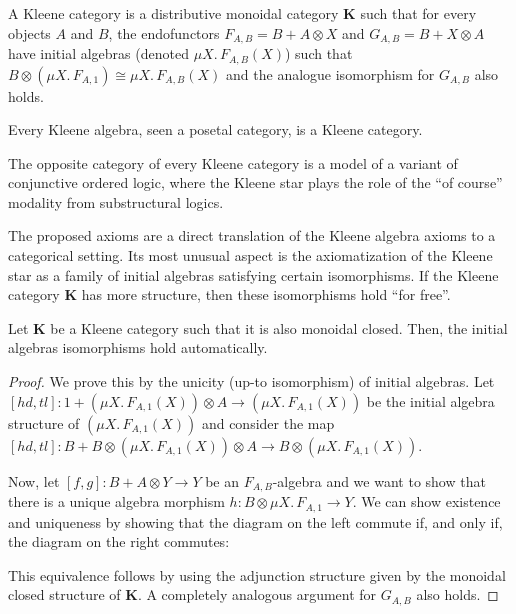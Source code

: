 \documentclass[sigconf,anonymous,review,screen]{acmart}
\newcommand{\cat}[1]{\mathbf{#1}}
\newif\ifdraft
\newcommand{\steven}[1]{\ifdraft{\color{orange}[{\bf Steven}: #1]}\fi}
\begin{document}
\begin{definition}
  A Kleene category is a distributive monoidal category $\cat{K}$
  such that for every objects $A$ and $B$, the endofunctors $F_{A, B}
  = B + A \otimes X$ and $G_{A, B} = B + X \otimes A$ have initial
  algebras (denoted $\mu X.\, F_{A, B}(X)$) such that $B \otimes (\mu
  X.\, F_{A, 1}) \cong \mu X.\, F_{A, B}(X)$ and the analogue isomorphism
  for $G_{A,B}$ also holds.
\end{definition}

\begin{example}
  Every Kleene algebra, seen a posetal category, is a Kleene category.
\end{example}

\begin{example}
  The opposite category of every Kleene category is a model of a variant of
  conjunctive ordered logic, where the Kleene star plays the role of the ``of
  course'' modality from substructural logics.
\end{example}

\steven{What is the ``of course'' modality? Is this ``$!$'' in linear logic?}

The proposed axioms are a direct translation of the Kleene algebra
axioms to a categorical setting. Its most unusual aspect is the
axiomatization of the Kleene star as a family of initial algebras
satisfying certain isomorphisms. If the Kleene category $\cat{K}$ has
more structure, then these isomorphisms hold ``for free''.

\begin{theorem}
  \label{th:kleeneclosed}
  Let $\cat{K}$ be a Kleene category such that it is also monoidal
  closed.  Then, the initial algebras isomorphisms hold automatically.
\end{theorem}
\begin{proof}
  We prove this by the unicity (up-to isomorphism) of initial
  algebras. Let $[hd, tl]: 1 + (\mu X.\, F_{A, 1}(X)) \otimes A \to
  (\mu X.\, F_{A, 1}(X))$ be the initial algebra structure of $(\mu
  X.\, F_{A, 1}(X))$ and consider the map $[hd, tl] : B + B \otimes
  (\mu X.\, F_{A, 1}(X)) \otimes A \to B\otimes (\mu X.\, F_{A,
    1}(X))$.

  Now, let $[f,g] : B + A \otimes Y \to Y$ be an $F_{A,B}$-algebra and
  we want to show that there is a unique algebra morphism $h : B
  \otimes \mu X.\, F_{A,1} \to Y$. We can show existence and uniqueness
  by showing that the diagram on the left commute if, and only if,
  the diagram on the right commutes:

  This equivalence follows by using the adjunction structure given
  by the monoidal closed structure of $\cat{K}$. A completely analogous
  argument for $G_{A,B}$ also holds.
\end{proof}
\end{document}
